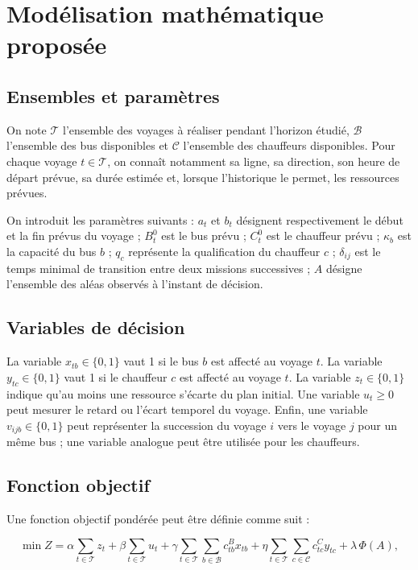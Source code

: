 \documentclass[12pt,a4paper]{article}
\newcommand{\Voy}{\mathcal{T}}
\newcommand{\Bus}{\mathcal{B}}
\newcommand{\Chauf}{\mathcal{C}}
\begin{document}
\section{Modélisation mathématique proposée}

\subsection{Ensembles et paramètres}

On note \(\Voy\) l’ensemble des voyages à réaliser pendant l’horizon étudié, \(\Bus\) l’ensemble des bus disponibles et \(\Chauf\) l’ensemble des chauffeurs disponibles. Pour chaque voyage \(t\in\Voy\), on connaît notamment sa ligne, sa direction, son heure de départ prévue, sa durée estimée et, lorsque l’historique le permet, les ressources prévues.

On introduit les paramètres suivants : \(a_t\) et \(b_t\) désignent respectivement le début et la fin prévus du voyage ; \(B_t^0\) est le bus prévu ; \(C_t^0\) est le chauffeur prévu ; \(\kappa_b\) est la capacité du bus \(b\) ; \(q_c\) représente la qualification du chauffeur \(c\) ; \(\delta_{ij}\) est le temps minimal de transition entre deux missions successives ; \(A\) désigne l’ensemble des aléas observés à l’instant de décision.

\subsection{Variables de décision}

La variable \(x_{tb}\in\{0,1\}\) vaut 1 si le bus \(b\) est affecté au voyage \(t\). La variable \(y_{tc}\in\{0,1\}\) vaut 1 si le chauffeur \(c\) est affecté au voyage \(t\). La variable \(z_t\in\{0,1\}\) indique qu’au moins une ressource s’écarte du plan initial. Une variable \(u_t\geq 0\) peut mesurer le retard ou l’écart temporel du voyage. Enfin, une variable \(v_{ijb}\in\{0,1\}\) peut représenter la succession du voyage \(i\) vers le voyage \(j\) pour un même bus ; une variable analogue peut être utilisée pour les chauffeurs.

\subsection{Fonction objectif}

Une fonction objectif pondérée peut être définie comme suit :

\begin{equation}
\min Z = \alpha \sum_{t\in\Voy} z_t
+ \beta \sum_{t\in\Voy} u_t
+ \gamma \sum_{t\in\Voy}\sum_{b\in\Bus} c^{B}_{tb}x_{tb}
+ \eta \sum_{t\in\Voy}\sum_{c\in\Chauf} c^{C}_{tc}y_{tc}
+ \lambda\,\Phi(A),
\end{equation}
\end{document}
